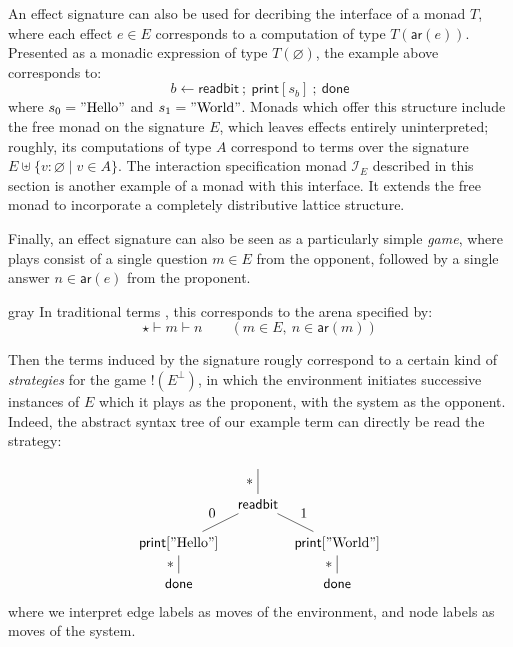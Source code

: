 \documentclass[sigplan,10pt,review,anonymous]{acmart}
\newcommand{\kw}[1]{\ensuremath{ \mathsf{#1} }}
\begin{document}
An effect signature can also be used
for decribing the interface of a monad $T$,
where each effect $e \in E$ corresponds to
a computation of type $T(\kw{ar}(e))$.
Presented as a monadic expression of type $T(\varnothing)$,
the example above corresponds to:
\[
  b \leftarrow \kw{readbit} \: ; \:
  \kw{print}[s_b] \: ; \:
  \kw{done}
\]
where $s_0 = "\text{Hello}"$ and $s_1 = "\text{World}"$.
Monads which offer this structure
include the free monad on the signature $E$,
which leaves effects entirely uninterpreted;
roughly, its computations of type $A$
correspond to terms over the signature
$E \uplus \{ v : \varnothing \mid v \in A \}$.
The interaction specification monad $\mathcal{I}_E$
described in this section is another example
of a monad with this interface.
It extends the free monad
to incorporate
a completely distributive lattice structure.

Finally,
an effect signature can also be seen as
a particularly simple \emph{game},
where plays consist of a single question $m \in E$ from the opponent,
followed by a single answer $n \in \kw{ar}(e)$ from the proponent.
\begin{color}{gray}
In traditional terms \cite{gamesem99},
this corresponds to the arena specified by:
\[
    \star \vdash m \vdash n \qquad
      (m \in E, \: n \in \kw{ar}(m))
\]
\end{color}
Then the terms induced by the signature
rougly correspond to a certain kind of \emph{strategies}
for the game $!(E^\bot)$,
in which the environment initiates successive
instances of $E$ which it plays as the proponent,
with the system as the opponent.
Indeed, the abstract syntax tree of our example term
can directly be read the strategy:
\[
  \begin{tikzpicture}
    \node (W) at (0,0) {};
    \node (R) at (0,-1) {$\kw{readbit}$};
    \node (W0) at (-2,-2) {$\kw{print}["\text{Hello}"]$};
    \node (W1) at (+2,-2) {$\kw{print}["\text{World}"]$};
    \node (K0) at (-2,-3) {$\kw{done}$};
    \node (K1) at (+2,-3) {$\kw{done}$};
    \path (W) edge node[auto,swap] {$*$} (R);
    \path (R) edge node[auto,swap] {0} (W0);
    \path (R) edge node[auto] {1} (W1);
    \path (W0) edge node[auto,swap] {$*$} (K0);
    \path (W1) edge node[auto,swap] {$*$} (K1);
  \end{tikzpicture}
\]
where we interpret edge labels
as moves of the environment,
and node labels as moves of the system.

\end{document}
